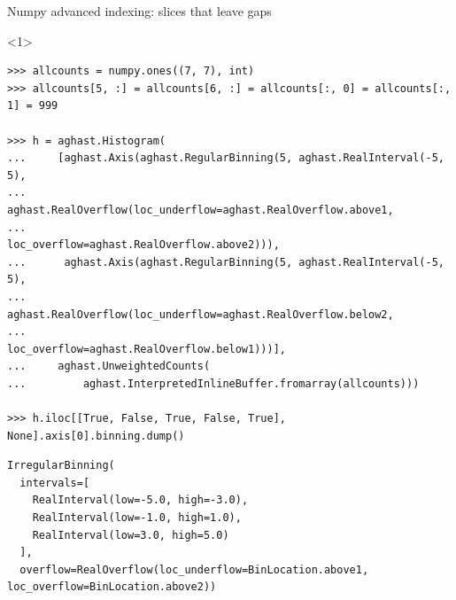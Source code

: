 \documentclass[aspectratio=169]{beamer}
\begin{document}
\begin{frame}[fragile]{Numpy advanced indexing: slices that leave gaps}
\scriptsize
\vspace{0.4 cm}
\begin{onlyenv}<1>
\begin{verbatim}
>>> allcounts = numpy.ones((7, 7), int)
>>> allcounts[5, :] = allcounts[6, :] = allcounts[:, 0] = allcounts[:, 1] = 999

>>> h = aghast.Histogram(
...     [aghast.Axis(aghast.RegularBinning(5, aghast.RealInterval(-5, 5),
...                  aghast.RealOverflow(loc_underflow=aghast.RealOverflow.above1,
...                                      loc_overflow=aghast.RealOverflow.above2))),
...      aghast.Axis(aghast.RegularBinning(5, aghast.RealInterval(-5, 5),
...                  aghast.RealOverflow(loc_underflow=aghast.RealOverflow.below2,
...                                      loc_overflow=aghast.RealOverflow.below1)))],
...     aghast.UnweightedCounts(
...         aghast.InterpretedInlineBuffer.fromarray(allcounts)))

>>> h.iloc[[True, False, True, False, True], None].axis[0].binning.dump()
\end{verbatim}
\begin{verbatim}
IrregularBinning(
  intervals=[
    RealInterval(low=-5.0, high=-3.0),
    RealInterval(low=-1.0, high=1.0),
    RealInterval(low=3.0, high=5.0)
  ],
  overflow=RealOverflow(loc_underflow=BinLocation.above1, loc_overflow=BinLocation.above2))
\end{verbatim}
\end{onlyenv}






\end{frame}
\end{document}
